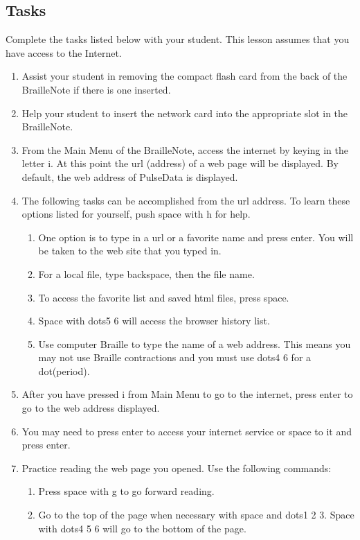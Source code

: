 \documentclass[10pt,letterpaper,twoside]{report}
\begin{document}
{{{\subsection{Tasks}
Complete the tasks listed below with your student.  This lesson assumes that you have access to the Internet.
\begin{enumerate}
	\item Assist your student in removing the compact flash card from the back of the BrailleNote if there is one inserted.
	\item Help your student to insert the network card into the appropriate slot in the BrailleNote.
	\item From the Main Menu of the BrailleNote, access the internet by keying in the letter i. At this point the url (address) of a web page will be displayed.  By default, the web address of PulseData is displayed.
	\item The following tasks can be accomplished from the url address.  To learn these options listed for yourself, push space with h for help.
	      \begin{enumerate}
		      \item One option is to type in a url or a favorite name and press enter.  You will be taken to the web site that you typed in.
		      \item For a local file, type backspace, then the file name.
		      \item To access the favorite list and saved html files, press space.
		      \item Space with dots5 6 will access the browser history list.
		      \item Use computer Braille to type the name of a web address.  This means you may not use Braille contractions and you must use dots4 6 for a dot(period).
	      \end{enumerate}
	\item After you have pressed i from Main Menu to go to the internet, press enter to go to the web address displayed.
	\item You may need to press enter to access your internet service or space to it and press enter.
	\item Practice reading the web page you opened.  Use the following commands:
	      \begin{enumerate}
		      \item Press space with g to go forward reading.
		      \item Go to the top of the page when necessary with space and dots1 2 3.  Space with dots4 5 6 will go to the bottom of the page.

\end{enumerate}
\end{enumerate}}}}
\end{document}
